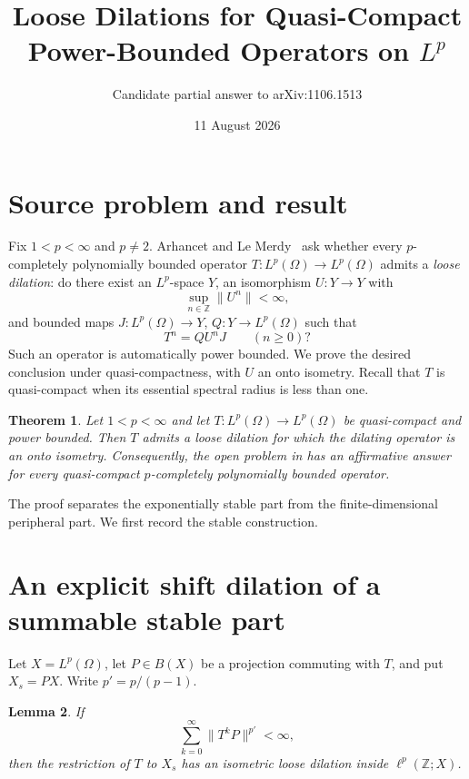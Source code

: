 \documentclass[11pt]{article}
\title{Loose Dilations for Quasi-Compact\\Power-Bounded Operators on $L^p$}
\author{Candidate partial answer to arXiv:1106.1513}
\date{11 August 2026}
\newtheorem{theorem}{Theorem}
\newtheorem{lemma}[theorem]{Lemma}
\newcommand{\Lp}{L^p}
\begin{document}
\maketitle

\begin{center}
\end{center}

\section{Source problem and result}

Fix $1<p<\infty$ and $p\ne2$.  Arhancet and Le Merdy~\cite{ALM} ask whether
every $p$-completely polynomially bounded operator
$T:\Lp(\Omega)\to\Lp(\Omega)$ admits a \emph{loose dilation}: do there exist
an $L^p$-space $Y$, an isomorphism $U:Y\to Y$ with
\[
 \sup_{n\in\mathbb Z}\|U^n\|<\infty,
\]
and bounded maps $J:\Lp(\Omega)\to Y$, $Q:Y\to\Lp(\Omega)$ such that
\[
 T^n=QU^nJ\qquad(n\ge0)?
\]
Such an operator is automatically power bounded.  We prove the desired
conclusion under quasi-compactness, with $U$ an onto isometry.  Recall that
$T$ is quasi-compact when its essential spectral radius is less than one.

\begin{theorem}\label{thm:main}
Let $1<p<\infty$ and let $T:\Lp(\Omega)\to\Lp(\Omega)$ be quasi-compact and
power bounded.  Then $T$ admits a loose dilation for which the dilating
operator is an onto isometry.  Consequently, the open problem in
\cite{ALM} has an affirmative answer for every quasi-compact
$p$-completely polynomially bounded operator.
\end{theorem}

The proof separates the exponentially stable part from the finite-dimensional
peripheral part.  We first record the stable construction.

\section{An explicit shift dilation of a summable stable part}

Let $X=\Lp(\Omega)$, let $P\in B(X)$ be a projection commuting with $T$, and
put $X_s=PX$.  Write $p'=p/(p-1)$.

\begin{lemma}\label{lem:stable}
If
\begin{equation}\label{eq:summable}
 \sum_{k=0}^{\infty}\|T^kP\|^{p'}<\infty,
\end{equation}
then the restriction of $T$ to $X_s$ has an isometric loose dilation inside
$\ell^p(\mathbb Z;X)$.
\end{lemma}
\end{document}
